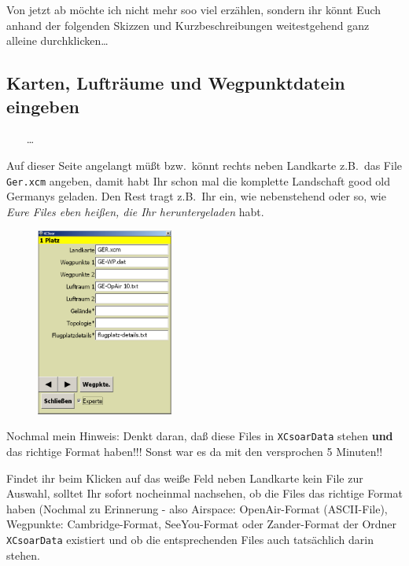 Von jetzt ab möchte ich nicht mehr soo viel erzählen, sondern ihr könnt Euch anhand der folgenden Skizzen und  Kurzbeschreibungen weitestgehend ganz alleine durchklicken\dots

\subsection{Karten, Lufträume und Wegpunktdatein eingeben}\label{fileseingeben}
\vspace*{0.5em}
\blink~\blink~\blink~ \far \far \dots \qquad {}\\[0.3em] \bblitz

Auf dieser Seite angelangt müßt bzw.\ könnt rechts neben \textsf{Landkarte} z.B.\ das File \texttt{Ger.xcm} angeben, damit habt Ihr schon mal die komplette Landschaft good old Germanys geladen. Den Rest tragt z.B.\ Ihr ein, wie nebenstehend oder so, wie \textsl{Eure Files eben heißen, die Ihr heruntergeladen} habt.

\begin{figure}
\includegraphics[width=4.5cm]{Bilder/Konfig1Platz.png}
\end{figure}

Nochmal mein Hinweis: Denkt daran, daß diese Files in \texttt{XCsoarData} stehen \textbf{und} das richtige Format haben!!! Sonst war es da mit den versprochen 5 Minuten!!

 Findet ihr beim Klicken auf das weiße Feld neben \textsf{Landkarte} kein File zur Auswahl, solltet Ihr sofort nocheinmal nachsehen, ob die Files das richtige Format haben (Nochmal zu Erinnerung - also Airspace: OpenAir-Format (ASCII-File), Wegpunkte: Cambridge-Format, SeeYou-Format oder Zander-Format der Ordner \texttt{XCsoar\-Data} existiert und ob die entsprechenden Files auch tatsächlich darin stehen. \\


